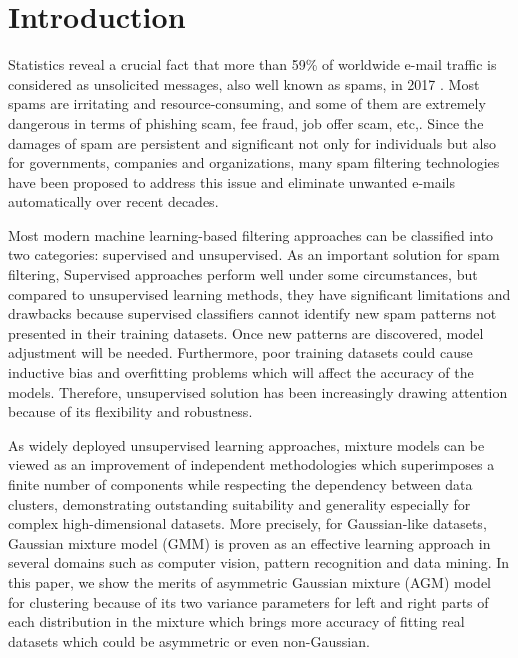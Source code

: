 \documentclass[conference]{IEEEtran}
\begin{document}
\section{Introduction}
Statistics reveal a crucial fact that more than 59\% of worldwide e-mail traffic is considered as unsolicited messages, also well known as spams, in 2017 \cite{spamStats}. Most spams are irritating and resource-consuming, and some of them are extremely dangerous in terms of phishing scam, fee fraud, job offer scam, etc,. Since the damages of spam are persistent and significant not only for individuals but also for governments, companies and organizations, many spam filtering technologies have been proposed to address this issue and eliminate unwanted e-mails automatically over recent decades. 

Most modern machine learning-based filtering approaches can be classified into two categories: supervised and unsupervised. As an important solution for spam filtering, Supervised approaches\cite{supervisedSpam} perform well under some circumstances, but compared to unsupervised learning methods, they have significant limitations and drawbacks because supervised classifiers cannot identify new spam patterns not presented in their training datasets. Once new patterns are discovered, model adjustment will be needed. Furthermore, poor training datasets could cause inductive bias and overfitting problems which will affect the accuracy of the models. Therefore, unsupervised solution has been increasingly drawing attention because of its flexibility and robustness.

As widely deployed unsupervised learning approaches, mixture models can be viewed as an improvement of independent methodologies which superimposes a finite number of components while respecting the dependency between data clusters, demonstrating outstanding suitability and generality especially for complex high-dimensional datasets. More precisely, for Gaussian-like datasets, Gaussian mixture model (GMM) \cite{b1} is proven as an effective   learning approach in several domains such as computer vision, pattern recognition and data mining. In this paper, we show the merits of asymmetric Gaussian mixture (AGM) model \cite{b2} for clustering because of its two variance parameters for left and right parts of each distribution in the mixture which brings more accuracy of fitting real datasets which could be asymmetric or even non-Gaussian. 
\end{document}
